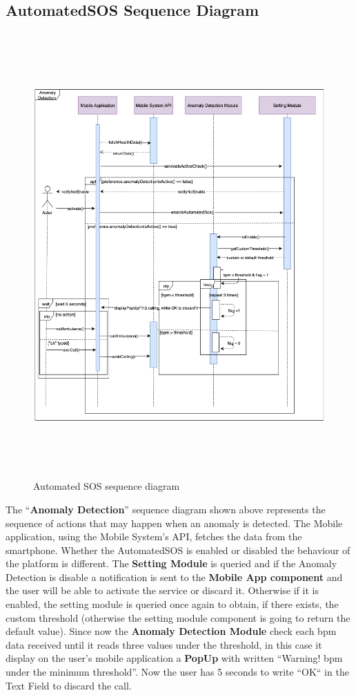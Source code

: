 \documentclass[DD.tex]{subfiles}
\begin{document}
\subsection{AutomatedSOS Sequence Diagram}
\begin{figure}[h!]
\centering
\includegraphics[height=17.00cm,keepaspectratio]{Figures/AutomatedSOS}
\caption{Automated SOS sequence diagram}
\end{figure}

The “\textbf{Anomaly Detection}” sequence diagram shown above represents the sequence of actions that may happen when an anomaly is detected.
The Mobile application, using the Mobile System’s API, fetches the data from the smartphone.
Whether the AutomatedSOS is enabled or disabled the behaviour of the platform is different.
The \textbf{Setting Module} is queried and if the Anomaly Detection is disable a notification is sent to the \textbf{Mobile App component} and the user will be able to activate the service or discard it.
Otherwise if it is enabled, the setting module is queried once again to obtain, if there exists, the custom threshold (otherwise the setting module component is going to return the default value).
Since now the \textbf{Anomaly Detection Module} check each bpm data received until it reads three values under the threshold, in this case it display on the user’s mobile application a \textbf{PopUp} with written “Warning! bpm under the minimum threshold”.
Now the user has 5 seconds to write “OK“ in the Text Field to discard the call.
\newpage
\end{document}
